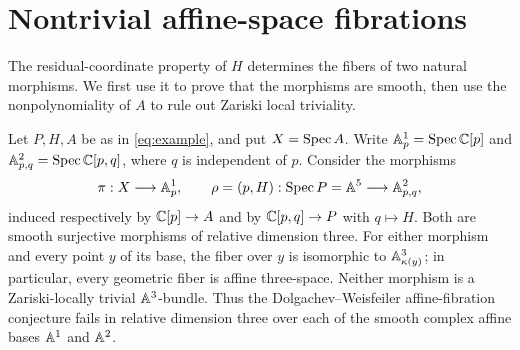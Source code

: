 \section{Nontrivial affine-space fibrations}
\label{sec:affine-fibrations}

The residual-coordinate property of $H$ determines the fibers of two
natural morphisms. We first use it to prove that the morphisms are smooth,
then use the nonpolynomiality of $A$ to rule out Zariski local triviality.

\begin{corollary}
\label{cor:affine-fibrations}
Let $P,H,A$ be as in \eqref{eq:example}, and put $X=\operatorname{Spec} A$. Write
$\mathbb A^1_p=\operatorname{Spec}\mathbb C[p]$ and
$\mathbb A^2_{p,q}=\operatorname{Spec}\mathbb C[p,q]$, where $q$ is independent of $p$.
Consider the morphisms
\[
 \pi:X\longrightarrow\mathbb A^1_p,
 \qquad
 \rho=(p,H):\operatorname{Spec} P=\mathbb A^5\longrightarrow\mathbb A^2_{p,q},
\]
induced respectively by $\mathbb C[p]\to A$ and by
$\mathbb C[p,q]\to P$ with $q\mapsto H$.
Both are smooth surjective morphisms of relative dimension three.
For either morphism and every point $y$ of its base, the fiber over $y$
is isomorphic to $\mathbb A^3_{\kappa(y)}$; in particular, every geometric
fiber is affine three-space. Neither morphism is a
Zariski-locally trivial $\mathbb A^3$-bundle.
Thus the Dolgachev--Weisfeiler affine-fibration conjecture fails in
relative dimension three over each of the smooth complex affine bases
$\mathbb A^1$ and $\mathbb A^2$.
\end{corollary}

